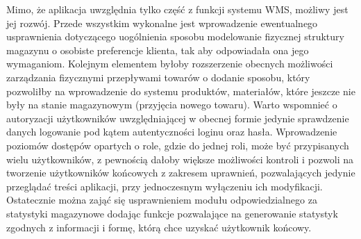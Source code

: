 	Mimo, że aplikacja uwzględnia tylko część z funkcji systemu WMS, możliwy jest jej rozwój. Przede wszystkim
	wykonalne jest wprowadzenie ewentualnego usprawnienia dotyczącego uogólnienia sposobu modelowanie fizycznej 
	struktury magazynu o osobiste prefe\-rencje klienta, tak aby odpowiadała ona jego wymaganiom. 
	Kolejnym elementem byłoby rozszerzenie obecnych	możliwości zarządzania fizycznymi przepływami towarów o dodanie sposobu, który pozwoliłby
	na wprowadzenie do systemu produktów, materiałów, które jeszcze nie były na stanie magazynowym (przyjęcia nowego towaru).
	Warto wspomnieć o autoryzacji użytkowników uwzględniającej w obecnej formie jedynie sprawdzenie danych
	logowanie pod kątem autentyczności loginu oraz hasła. Wprowadzenie poziomów dostępów opartych o role,
	gdzie do jednej roli, może być przypisanych wielu użytkowników, z pewnością
	dałoby większe możliwości kontroli i pozwoli na tworzenie użytkowników końcowych z zakresem uprawnień,
	pozwalających jedynie przeglądać treści aplikacji, przy jednoczesnym wyłączeniu ich modyfikacji.
	Ostatecznie można zająć się usprawnieniem modułu odpowiedzialnego za statystyki magazynowe dodając funkcje
	pozwalające na generowanie statystyk zgodnych z informacji i formę, którą chce uzyskać użytkownik końcowy.